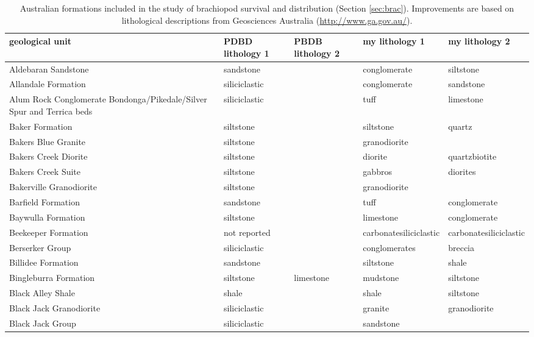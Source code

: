 \begin{tiny}
\begin{longtable}{p{5cm} l l l l}
  \caption[Lithological assignments for Australian formations]{Australian formations included in the study of brachiopod survival and distribution (Section \ref{sec:brac}). Improvements are based on lithological descriptions from Geosciences Australia (\url{http://www.ga.gov.au/}).} \\ %
    geological unit & PDBD lithology 1 & PBDB lithology 2 & my lithology 1 & my lithology 2 \\ 
    \hline
    Aldebaran Sandstone & sandstone &  & conglomerate & siltstone \\ 
    Allandale Formation & siliciclastic &  & conglomerate & sandstone \\ 
    Alum Rock Conglomerate Bondonga/Pikedale/Silver Spur and Terrica beds & siliciclastic &  & tuff & limestone \\ 
    Baker Formation & siltstone &  & siltstone & quartz \\ 
    Bakers Blue Granite & siltstone &  & granodiorite &  \\ 
    Bakers Creek Diorite & siltstone &  & diorite & quartzbiotite \\ 
    Bakers Creek Suite & siltstone &  & gabbros & diorites \\ 
    Bakerville Granodiorite & siltstone &  & granodiorite &  \\ 
    Barfield Formation & sandstone &  & tuff & conglomerate \\ 
    Baywulla Formation & siltstone &  & limestone & conglomerate \\ 
    Beekeeper Formation & not reported &  & carbonatesiliciclastic & carbonatesiliciclastic \\ 
    Berserker Group & siliciclastic &  & conglomerates & breccia \\ 
    Billidee Formation & sandstone &  & siltstone & shale \\ 
    Bingleburra Formation & siltstone & limestone & mudstone & siltstone \\ 
    Black Alley Shale & shale &  & shale & siltstone \\ 
    Black Jack Granodiorite & siliciclastic &  & granite & granodiorite \\ 
    Black Jack Group & siliciclastic &  & sandstone &  \\ 

\end{longtable}
\end{tiny}

